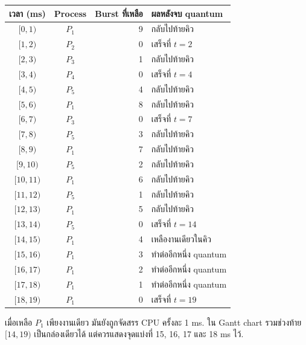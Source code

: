 {\small\begin{center}\renewcommand{\arraystretch}{1.12}\begin{tabular}{c|c|r|l}
เวลา (ms) & Process & Burst ที่เหลือ & ผลหลังจบ quantum\\\hline
$[0,1)$ & $P_1$ & 9 & กลับไปท้ายคิว\\
$[1,2)$ & $P_2$ & 0 & เสร็จที่ $t=2$\\
$[2,3)$ & $P_3$ & 1 & กลับไปท้ายคิว\\
$[3,4)$ & $P_4$ & 0 & เสร็จที่ $t=4$\\
$[4,5)$ & $P_5$ & 4 & กลับไปท้ายคิว\\
$[5,6)$ & $P_1$ & 8 & กลับไปท้ายคิว\\
$[6,7)$ & $P_3$ & 0 & เสร็จที่ $t=7$\\
$[7,8)$ & $P_5$ & 3 & กลับไปท้ายคิว\\
$[8,9)$ & $P_1$ & 7 & กลับไปท้ายคิว\\
$[9,10)$ & $P_5$ & 2 & กลับไปท้ายคิว\\
$[10,11)$ & $P_1$ & 6 & กลับไปท้ายคิว\\
$[11,12)$ & $P_5$ & 1 & กลับไปท้ายคิว\\
$[12,13)$ & $P_1$ & 5 & กลับไปท้ายคิว\\
$[13,14)$ & $P_5$ & 0 & เสร็จที่ $t=14$\\
$[14,15)$ & $P_1$ & 4 & เหลืองานเดียวในคิว\\
$[15,16)$ & $P_1$ & 3 & ทำต่ออีกหนึ่ง quantum\\
$[16,17)$ & $P_1$ & 2 & ทำต่ออีกหนึ่ง quantum\\
$[17,18)$ & $P_1$ & 1 & ทำต่ออีกหนึ่ง quantum\\
$[18,19)$ & $P_1$ & 0 & เสร็จที่ $t=19$\\
\end{tabular}\end{center}}
\noindent เมื่อเหลือ $P_1$ เพียงงานเดียว มันยังถูกจัดสรร CPU ครั้งละ 1 ms. ใน Gantt chart รวมช่วงท้าย $[14,19)$ เป็นกล่องเดียวได้ แต่ควรแสดงจุดแบ่งที่ 15, 16, 17 และ 18 ms ไว้.\par

